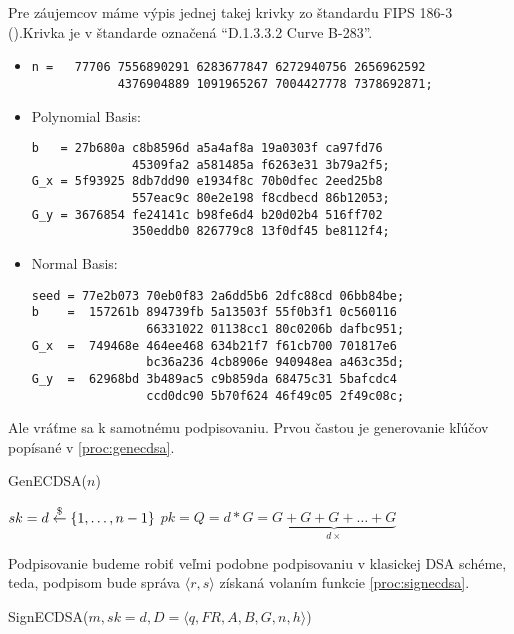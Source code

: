 \begin{poznamka}
    Pre záujemcov máme výpis jednej takej krivky zo štandardu FIPS 186-3
    (\cite{fips186}).Krivka je v štandarde označená
    ``D.1.3.3.2 Curve B-283''.
    \begin{itemize}
        \item
            \begin{verbatim}
n =   77706 7556890291 6283677847 6272940756 2656962592 
            4376904889 1091965267 7004427778 7378692871;
            \end{verbatim}
        \item Polynomial Basis:  
            \begin{verbatim}
b   = 27b680a c8b8596d a5a4af8a 19a0303f ca97fd76
              45309fa2 a581485a f6263e31 3b79a2f5;
G_x = 5f93925 8db7dd90 e1934f8c 70b0dfec 2eed25b8
              557eac9c 80e2e198 f8cdbecd 86b12053; 
G_y = 3676854 fe24141c b98fe6d4 b20d02b4 516ff702
              350eddb0 826779c8 13f0df45 be8112f4; 
            \end{verbatim}
        \item Normal Basis:  
            \begin{verbatim}
seed = 77e2b073 70eb0f83 2a6dd5b6 2dfc88cd 06bb84be;
b    =  157261b 894739fb 5a13503f 55f0b3f1 0c560116
                66331022 01138cc1 80c0206b dafbc951;
G_x  =  749468e 464ee468 634b21f7 f61cb700 701817e6
                bc36a236 4cb8906e 940948ea a463c35d; 
G_y  =  62968bd 3b489ac5 c9b859da 68475c31 5bafcdc4
                ccd0dc90 5b70f624 46f49c05 2f49c08c; 
            \end{verbatim}
    \end{itemize}
\end{poznamka}

Ale vráťme sa k samotnému podpisovaniu. Prvou častou je generovanie
kľúčov popísané v \ref{proc:genecdsa}.

\begin{procedure}[H]
    \caption{GenECDSA($n$)}
    \label{proc:genecdsa}
    $sk = d \overset{\$}{\leftarrow} \{1, \dots, n-1\}$ \;
    $pk = Q = d*G = \underbrace{G+G+G+\dots+G}_{d \times}$ \;
\end{procedure}

Podpisovanie budeme robiť veľmi podobne podpisovaniu v klasickej DSA
schéme, teda, podpisom bude správa $\langle r,s \rangle$ získaná 
volaním funkcie \ref{proc:signecdsa}.

\begin{procedure}[H]
    \caption{SignECDSA($m,sk=d, D=\langle q,FR, A,B,G,n,h \rangle$)}
    \label{proc:signecdsa}
    \;
\end{procedure}

